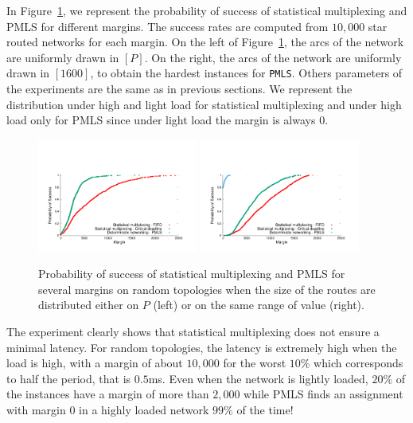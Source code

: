 \documentclass[a4paper,10pt]{article}
\newcommand\PMLS{\texttt{PMLS}\xspace}
\begin{document}
	    
   In Figure~\ref{fig:sto}, we represent the probability of success of statistical multiplexing and PMLS for different margins. The success rates are computed from $10,000$ star routed networks for each margin. On the left of Figure~\ref{fig:sto}, the arcs of the network are uniformly drawn in $[P]$. On the right, the arcs of the network are uniformly drawn in $[1600]$, to obtain the hardest instances for \PMLS. Others parameters of the experiments are the same as in previous sections. We represent the distribution under high and light load for statistical multiplexing and under high load only for PMLS since under light load the margin is always $0$. 
    \begin{figure}
    
   

       \begin{center}
      \includegraphics[width = 0.47\textwidth]{stochasticdistrib.pdf}
      \includegraphics[width = 0.47\textwidth]{stochastic.pdf}
     
       \end{center}
  \caption{Probability of success of statistical multiplexing and PMLS for several margins on random topologies when the size of the routes are distributed either on $P$ (left) or on the same range of value (right).}
      \label{fig:sto} 
      \end{figure}
      
     
    The experiment clearly shows that statistical multiplexing does not ensure a minimal latency. 
    For random topologies, the latency is extremely high when the load is high, with a margin of about $10,000$ for the worst $10\%$ which corresponds to half the period, that is $0.5$ms. Even when the network is lightly loaded, $20\%$ of the instances have a margin of more than $2,000$ while PMLS finds an assignment with margin $0$ in a highly loaded network $99\%$ of the time! 
    
\end{document}
